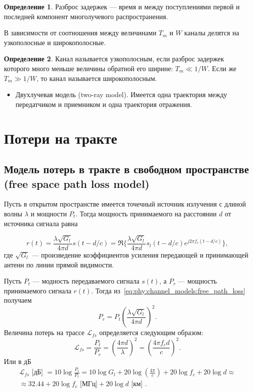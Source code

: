 \documentclass{book}
\numberwithin{theorem}{chapter}
\numberwithin{statement}{chapter}
\numberwithin{lemma}{chapter}
\theoremstyle{definition}
\numberwithin{task}{chapter}
\theoremstyle{remark}
\numberwithin{example}{chapter}
\theoremstyle{definition}
\newtheorem{definition}{Определение}
\numberwithin{definition}{chapter}
\theoremstyle{remark}
\theoremstyle{remark}
\numberwithin{lyrics}{section}
\begin{document}
\begin{definition}
	Разброс задержек --- время и между поступлениями первой и последней компонент многолучевого распространения.
\end{definition}
В зависимости от соотношения между величинами $T_m$ и $W$ каналы делятся на узкополосные и широкополосные.
\begin{definition}
	Канал называется узкополосным, если разброс задержек которого много меньше величины обратной его ширине: $T_m \ll 1 / W$. Если же $T_m \gg 1 / W$, то канал называется широкополосным.
\end{definition}

\begin{itemize}
\item Двухлучевая модель (two-ray model). Имеется одна траектория между передатчиком и приемником и одна траектория отражения.
\end{itemize}

\section{Потери на тракте}
\subsection{Модель потерь в тракте в свободном пространстве (free space path loss model)}
Пусть в открытом пространстве имеется точечный источник излучения с длиной волны $\lambda$ и мощности $P_t$. Тогда мощность принимаемого на расстоянии $d$ от источника сигнала равна

\begin{equation}
\label{eq:phy:channel_models:free_path_loss}
r(t) = \frac{\lambda \sqrt{G_l}}{4\pi d} s(t - d /c) = \Re\{\frac{\lambda \sqrt{G_l}}{4\pi d}s_l (t - d / c) e^{j2\pi f_c (t - d / c)}\},
\end{equation}
где $\sqrt{G_l}$ --- произведение коэффициентов усиления передающей и принимающей антенн по линии прямой видимости.

Пусть $P_t$ --- модность передаваемого сигнала $s(t)$, а $P_r$ --- мощность принимаемого сигнала $r(t)$. Тогда из~\eqref{eq:phy:channel_models:free_path_loss} получаем
\begin{equation*}
P_r = P_t \left(\frac{\lambda\sqrt{G_l}}{4\pi d}\right)^2.
\end{equation*}
Величина потерь на трассе $\mathcal{L}_{fs}$ определяется следующим образом:
\begin{equation*}
\mathcal{L}_{fs} = \frac{P_t}{P_r} = \left(\frac{4\pi d}{\lambda}\right)^2 = \left(\frac{4\pi f_c d}{c}\right)^2 .
\end{equation*}
Или в дБ
\begin{gather*}
\mathcal{L}_{fs} \text{ [дБ] } = 10 \log \frac{P_t}{P_r} = 10 \log G_l + 20 \log \left(\frac{4\pi}{c}\right) + 20 \log f_c + 20 \log d \approx \\ 
\approx 32.44 + 20 \log f_c \text{ [МГц]} + 20 \log d \text{ [км] }.
\end{gather*}
\end{document}
